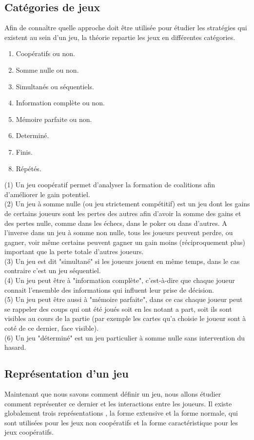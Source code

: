\documentclass[a4paper, 12pt, french]{article}
\begin{document}
	\subsection{Catégories de jeux}
	Afin de connaître quelle approche doit être utilisée pour étudier les stratégies qui existent au sein d'un jeu,
	la théorie repartie les jeux en différentes catégories\cite{wiki_typo_theorie_jeux}.
	\begin{enumerate}
		\item Coopératifs ou non.
		\item Somme nulle ou non.
		\item Simultanés ou séquentiels.
		\item Information complète ou non.
		\item Mémoire parfaite ou non.
		\item Determiné.
		\item Finis.
		\item Répétés.
	\end{enumerate}
	(1) Un jeu coopératif permet d'analyser la formation de coalitions afin d'améliorer le gain potentiel. \\
	(2) Un jeu à somme nulle (ou jeu strictement compétitif) est un jeu dont les gains de certains joueurs
	sont les pertes des autres afin d'avoir la somme des gains et des pertes nulle, comme dans les échecs,
	dans le poker ou dans d'autres. A l'inverse dans un jeu à somme non nulle, tous les joueurs peuvent perdre,
	ou gagner, voir même certains peuvent gagner un gain moins (réciproquement plus) important que la perte totale
	d'autres joueurs.\\
	(3) Un jeu est dit "simultané" si les joueurs jouent en même temps, dans le cas contraire c'est un jeu séquentiel.\\
	(4) Un jeu peut être à "information complète", c'est-à-dire que chaque joueur connait l'ensemble des informations
	qui influent leur prise de décision.\\
	(5) Un jeu peut être aussi à "mémoire parfaite", dans ce cas chaque joueur peut se rappeler des coups qui ont été
	joués soit en les notant a part, soit ils sont visibles au cours de la partie (par exemple les cartes qu'a choisie
	le joueur sont à coté de ce dernier, face visible).\\
	(6) Un jeu "déterminé" est un jeu particulier à somme nulle sans intervention du hasard.

	\subsection{Représentation d'un jeu}
	Maintenant que nous savons comment définir un jeu, nous allons étudier comment représenter ce dernier et les
	interactions entre les joueurs. Il existe globalement trois représentations\cite{wiki_representation_theorie_jeux}
	, la forme extensive et la forme normale, qui sont utilisées pour les jeux non coopératifs et
	la forme caractéristique pour les jeux coopératifs.
\end{document}
